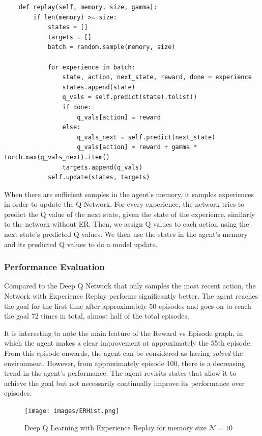 \documentclass{article}
\begin{document}
\begin{verbatim}
    def replay(self, memory, size, gamma):
        if len(memory) >= size:
            states = []
            targets = []
            batch = random.sample(memory, size)

            for experience in batch:
                state, action, next_state, reward, done = experience
                states.append(state)
                q_vals = self.predict(state).tolist()
                if done:
                    q_vals[action] = reward
                else: 
                    q_vals_next = self.predict(next_state)
                    q_vals[action] = reward + gamma * torch.max(q_vals_next).item()
                targets.append(q_vals)
            self.update(states, targets)
\end{verbatim}

When there are sufficient samples in the agent's memory, it samples experiences in order to update the Q Network. For every experience, the network tries to predict the Q value of the next state, given the state of the experience, similarly to the network without ER. Then, we assign Q values to each action using the next state's predicted Q values. We then use the states in the agent's memory and its predicted Q values to do a model update.


\subsubsection{Performance Evaluation}

Compared to the Deep Q Network that only samples the most recent action, the Network with Experience Replay performs significantly better. The agent reaches the goal for the first time after approximately 50 episodes and goes on to reach the goal 72 times in total, almost half of the total episodes. 

It is interesting to note the main feature of the Reward vs Episode graph, in which the agent makes a clear improvement at approximately the 55th episode. From this episode onwards, the agent can be considered as having \textit{solved} the environment. However, from approximately episode 100, there is a decreasing trend in the agent's performance. The agent revisits states that allow it to achieve the goal but not necessarily continually improve its performance over episodes. 


\begin{figure}[H]
    \centering
    \texttt{[image: images/ERHist.png]}
    \caption{Deep Q Learning with Experience Replay for memory size $\mathcal{N}=10$}
    \label{fig:my_label}
\end{figure}
\end{document}
